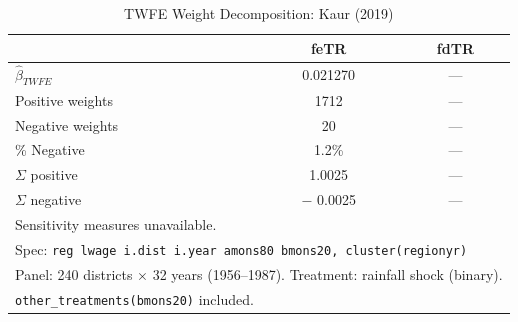 \begin{table}[htbp]
\centering
\caption{TWFE Weight Decomposition: Kaur (2019)}
\label{tab:kaur_weights}
\begin{tabular}{lcc}
\hline\hline
 & feTR & fdTR \\
\hline
$\hat{\beta}_{TWFE}$ &     0.021270 & --- \\
Positive weights &      1712 & --- \\
Negative weights &        20 & --- \\
\% Negative &   1.2\% & --- \\
$\Sigma$ positive &    1.0025 & --- \\
$\Sigma$ negative & $-$   0.0025 & --- \\
\hline
\multicolumn{3}{l}{\footnotesize Sensitivity measures unavailable.} \\
\hline
\multicolumn{3}{l}{\footnotesize Spec: \texttt{reg lwage i.dist i.year amons80 bmons20, cluster(regionyr)}} \\
\multicolumn{3}{l}{\footnotesize Panel: 240 districts $\times$ 32 years (1956--1987). Treatment: rainfall shock (binary).} \\
\multicolumn{3}{l}{\footnotesize \texttt{other\_treatments(bmons20)} included.} \\
\hline\hline
\end{tabular}
\end{table}
